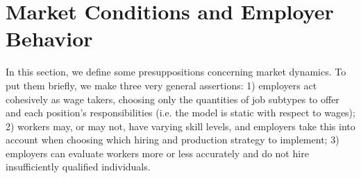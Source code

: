\documentclass[hidelinks, nonatbib]{elsarticle}
\begin{document}
\section{Market Conditions and Employer Behavior}
In this section, we define some presuppositions concerning market dynamics. To put them briefly, we make three very general assertions: 1) employers act cohesively as wage takers, choosing only the quantities of job subtypes to offer and each position's responsibilities (i.e. the model is static with respect to wages); 2) workers may, or may not, have varying skill levels, and employers take this into account when choosing which hiring and production strategy to implement; 3) employers can evaluate workers more or less accurately and do not hire insufficiently qualified individuals.
\end{document}
